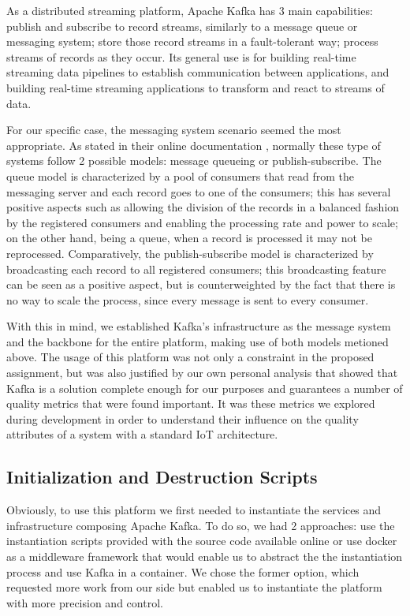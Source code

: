 \documentclass[12pt]{article}
\begin{document}
As a distributed streaming platform, Apache Kafka has 3 main capabilities: publish and subscribe to record streams, similarly to a message queue or 
messaging system; store those record streams in a fault-tolerant way; process streams of records as they occur. 
Its general use is for building real-time streaming data pipelines to establish communication between applications, and building real-time streaming applications 
to transform and react to streams of data.

For our specific case, the messaging system scenario seemed the most appropriate.
As stated in their online documentation \cite{kafka}, normally these type of systems follow 2 possible models: message queueing or publish-subscribe. 
The queue model is characterized by a pool of consumers that read from the messaging server and each record goes to one of the consumers; 
this has several positive aspects such as allowing the division of the records in a balanced fashion by the registered consumers and enabling the processing rate 
and power to scale; on the other hand, being a queue, when a record is processed it may not be reprocessed.
Comparatively, the publish-subscribe model is characterized by broadcasting each record to all registered consumers; this broadcasting feature can be seen as a 
positive aspect, but is counterweighted by the fact that there is no way to scale the process, since every message is sent to every consumer.

With this in mind, we established Kafka's infrastructure as the message system and the backbone for the entire platform, making use of both models metioned above.
The usage of this platform was not only a constraint in the proposed assignment, but was also justified by our own personal analysis that showed that Kafka is a 
solution complete enough for our purposes and guarantees a number of quality metrics that were found important.
It was these metrics we explored during development in order to understand their influence on the quality attributes of a system with a standard IoT architecture. 

\subsection{Initialization and Destruction Scripts} %

Obviously, to use this platform we first needed to instantiate the services and infrastructure composing Apache Kafka. 
To do so, we had 2 approaches: use the instantiation scripts provided with the source code available online \cite{kafka} or use docker as a middleware 
framework that would enable us to abstract the the instantiation process and use Kafka in a container. 
We chose the former option, which requested more work from our side but enabled us to instantiate the platform with more precision and control.
\end{document}
